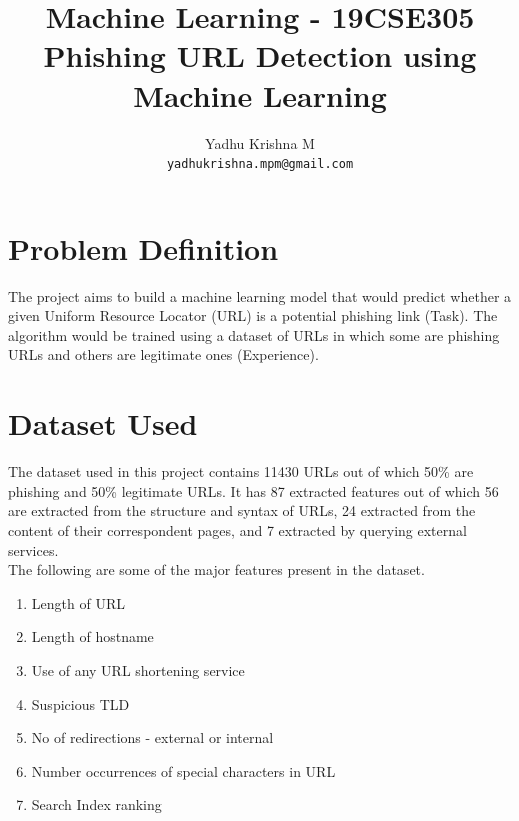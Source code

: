 \documentclass[letterpaper, 28pt, fleqn]{article}
\author{Yadhu Krishna M \\
\texttt{yadhukrishna.mpm@gmail.com}
}
\begin{document}

\title{Machine Learning - 19CSE305 \\ \huge{\textbf{Phishing URL Detection using Machine Learning}}}

\setlength{\columnsep}{0.45in}

\setcounter{page}{1}


\maketitle

\begin{multicols}{2}
\section{Problem Definition}

The project aims to build a machine learning model that would predict whether a given Uniform Resource Locator (URL) is a potential phishing link (Task). The algorithm would be trained using a dataset of URLs in which some are phishing URLs and others are legitimate ones (Experience). 


\section{Dataset Used}

The dataset used in this project contains 11430 URLs out of which 50\% are phishing and 50\% legitimate URLs. It has 87 extracted features out of which 56 are extracted from the structure and syntax of URLs, 24 extracted from the content of their correspondent pages, and 7 extracted by querying external services. \\
The following are some of the major features present in the dataset. 
\begin{enumerate}
\item Length of URL 
\item Length of hostname
\item Use of any URL shortening service
\item Suspicious TLD
\item No of redirections - external or internal
\item Number occurrences of special characters in URL
\item Search Index ranking
\end{enumerate}


\end{multicols}
\end{document}
